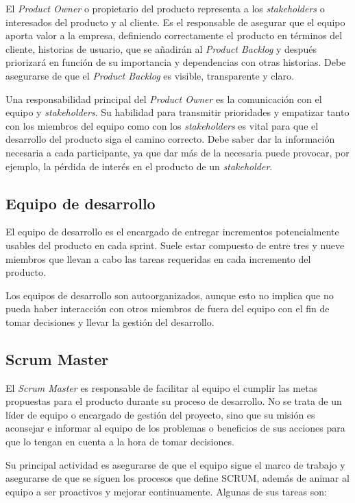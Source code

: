 El \emph{Product Owner} o propietario del producto representa a los \emph{stakeholders} o interesados del producto y al cliente. Es el responsable de asegurar que el equipo aporta valor a la empresa, definiendo correctamente el producto en términos del cliente, historias de usuario, que se añadirán al \emph{Product Backlog} y después priorizará en función de su importancia y dependencias con otras historias. Debe asegurarse de que el \emph{Product Backlog}  es visible, transparente y claro.

Una responsabilidad principal del \emph{Product Owner} es la comunicación con el equipo y \emph{stakeholders}. Su habilidad para transmitir prioridades y empatizar tanto con los miembros del equipo como con los \emph{stakeholders} es vital para que el desarrollo del producto siga el camino correcto. Debe saber dar la información necesaria a cada participante, ya que dar más de la necesaria puede provocar, por ejemplo, la pérdida de interés en el producto de un \emph{stakeholder}.

\subsection{Equipo de desarrollo}
\label{equipo}

El equipo de desarrollo es el encargado de entregar incrementos potencialmente usables del producto en cada sprint. Suele estar compuesto de entre tres y nueve miembros que llevan a cabo las tareas requeridas en cada incremento del producto.

Los equipos de desarrollo son autoorganizados, aunque esto no implica que no pueda haber interacción con otros miembros de fuera del equipo con el fin de tomar decisiones y llevar la gestión del desarrollo.

\subsection{Scrum Master}
\label{scrumMaster}

El \emph{Scrum Master} es responsable de facilitar al equipo el cumplir las metas propuestas para el producto durante su proceso de desarrollo. No se trata de un líder de equipo o encargado de gestión del proyecto, sino que su misión es aconsejar e informar al equipo de los problemas o beneficios de sus acciones para que lo tengan en cuenta a la hora de tomar decisiones.

Su principal actividad es asegurarse de que el equipo sigue el marco de trabajo y asegurarse de que se siguen los procesos que define SCRUM, además de animar al equipo a ser proactivos y mejorar continuamente. Algunas de sus tareas son:

